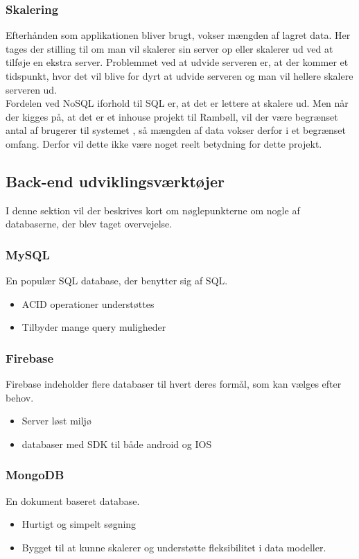 \subsubsection{Skalering}
Efterhånden som applikationen bliver brugt, vokser mængden af lagret data. Her tages der stilling til om man vil skalerer sin server op eller skalerer ud ved at tilføje en ekstra server. Problemmet ved at udvide serveren er, at der kommer et tidspunkt, hvor det vil blive for dyrt at udvide serveren og man vil hellere skalere serveren ud. \\
Fordelen ved NoSQL iforhold til SQL er, at det er lettere at skalere ud. Men
når der kigges på, at det er et inhouse projekt til Rambøll, vil der være begrænset antal af brugerer til systemet , så mængden af data vokser derfor i et begrænset omfang. 
Derfor vil dette ikke være noget reelt betydning for dette projekt.

\subsection{Back-end udviklingsværktøjer}
I denne sektion vil der beskrives kort om nøglepunkterne om nogle af databaserne, der blev taget overvejelse. 

\subsubsection{MySQL\cite{MySQL}}
En populær SQL database, der benytter sig af SQL.
\begin{itemize}[-]
	\item ACID\cite{ACID} operationer understøttes
	\item Tilbyder mange query muligheder
\end{itemize}

\subsubsection{Firebase\cite{Firebase}}
Firebase indeholder flere databaser til hvert deres formål, som kan vælges efter behov. 
\begin{itemize}[-]
	\item Server løst miljø
	\item databaser med SDK til både android og IOS
\end{itemize}

\subsubsection{MongoDB\cite{mongoDB}}
En dokument baseret database.
\begin{itemize}[-]
	\item Hurtigt og simpelt søgning
	\item Bygget til at kunne skalerer og understøtte fleksibilitet i data modeller. 
	
\end{itemize}

